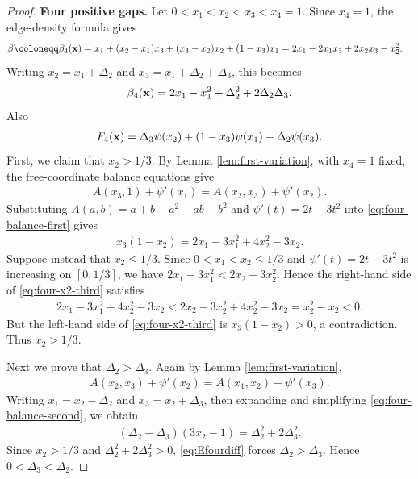 \documentclass[10pt,a4paper]{article}
\begin{document}
\begin{proof}
\medskip
\noindent\textbf{Four positive gaps.}
Let $0<x_1<x_2<x_3<x_4=1$.  Since $x_4=1$, the edge-density formula gives
\begin{align}
 \beta\coloneqq \beta_4({\bf x})%
  &=x_1+(x_2-x_1)x_3+(x_3-x_2)x_2+(1-x_3)x_1=2x_1-2x_1x_3+2x_2x_3-x_2^2.
\end{align}
Writing $x_2=x_1+\Delta_2$ and $x_3=x_1+\Delta_2+\Delta_3$, this becomes
\begin{align}\label{eq:four-beta}
  \beta_4({\bf x})=2x_1-x_1^2+\Delta_2^2+2\Delta_2\Delta_3.
\end{align}
Also
\begin{align}\label{eq:four-F}
  F_4({\bf x})=\Delta_3\psi(x_2)+(1-x_3)\psi(x_1)+\Delta_2\psi(x_3).
\end{align}
First, we claim that $x_2>1/3$.  By Lemma \ref{lem:first-variation}, with $x_4=1$ fixed, the free-coordinate balance equations give
\begin{align}\label{eq:four-balance-first}
  A(x_3,1)+\psi'(x_1)=A(x_2,x_3)+\psi'(x_2).
\end{align}
Substituting $A(a,b)=a+b-a^2-ab-b^2$ and $\psi'(t)=2t-3t^2$ into
\eqref{eq:four-balance-first} gives
\begin{align}\label{eq:four-x2-third}
  x_3(1-x_2)=2x_1-3x_1^2+4x_2^2-3x_2.
\end{align}
Suppose instead that $x_2\le1/3$.  Since $0<x_1<x_2\le1/3$ and
$\psi'(t)=2t-3t^2$ is increasing on $[0,1/3]$, we have
$
  2x_1-3x_1^2<2x_2-3x_2^2.
$
Hence the right-hand side of \eqref{eq:four-x2-third} satisfies
\begin{align*}
  2x_1-3x_1^2+4x_2^2-3x_2
  <2x_2-3x_2^2+4x_2^2-3x_2
  =x_2^2-x_2<0.
\end{align*}
But the left-hand side of \eqref{eq:four-x2-third} is $x_3(1-x_2)>0$, a contradiction.  Thus $x_2>1/3$.

Next we prove that $\Delta_2>\Delta_3$.  Again by Lemma \ref{lem:first-variation},
\begin{align}\label{eq:four-balance-second}
  A(x_2,x_3)+\psi'(x_2)=A(x_1,x_2)+\psi'(x_3).
\end{align}
Writing $x_1=x_2-\Delta_2$ and $x_3=x_2+\Delta_3$, then expanding and simplifying
\eqref{eq:four-balance-second}, we obtain
\begin{align}\label{eq:Efourdiff}
  (\Delta_2-\Delta_3)(3x_2-1)=\Delta_2^2+2\Delta_3^2.
\end{align}
Since $x_2>1/3$ and $\Delta_2^2+2\Delta_3^2>0$, \eqref{eq:Efourdiff} forces
$\Delta_2>\Delta_3$.  Hence $0<\Delta_3<\Delta_2$.


\end{proof}
\end{document}
